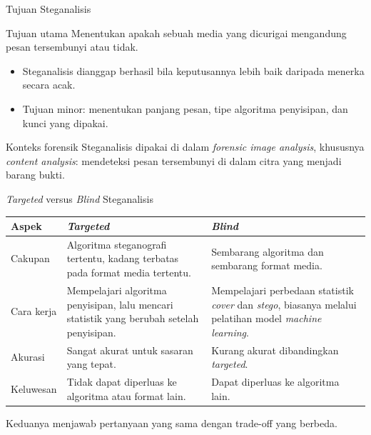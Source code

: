 \documentclass[aspectratio=169,11pt]{beamer}
\begin{document}
\begin{frame}{Tujuan Steganalisis}
    \begin{block}{Tujuan utama}
        Menentukan apakah sebuah media yang dicurigai mengandung pesan
        tersembunyi atau tidak.
    \end{block}
    \vspace{0.15cm}
    \begin{itemize}
        \item Steganalisis dianggap berhasil bila keputusannya lebih baik
              daripada menerka secara acak.
        \item Tujuan minor: menentukan panjang pesan, tipe algoritma
              penyisipan, dan kunci yang dipakai.
    \end{itemize}
    \vspace{0.15cm}
    \begin{exampleblock}{Konteks forensik}
        \footnotesize
        Steganalisis dipakai di dalam \textit{forensic image analysis},
        khususnya \textit{content analysis}: mendeteksi pesan tersembunyi di
        dalam citra yang menjadi barang bukti.
    \end{exampleblock}
\end{frame}

\begin{frame}{\textit{Targeted} versus \textit{Blind} Steganalisis}
    \footnotesize
    \renewcommand{\arraystretch}{1.2}
    \begin{tabularx}{\linewidth}{@{}>{\raggedright\arraybackslash}p{2.6cm}
        >{\raggedright\arraybackslash}X
        >{\raggedright\arraybackslash}X@{}}
        \toprule
        Aspek & \textit{Targeted} & \textit{Blind} \\
        \midrule
        Cakupan & Algoritma steganografi tertentu, kadang terbatas pada format
                 media tertentu. & Sembarang algoritma dan sembarang format
                 media. \\
        \addlinespace
        Cara kerja & Mempelajari algoritma penyisipan, lalu mencari statistik
                    yang berubah setelah penyisipan. & Mempelajari perbedaan
                    statistik \textit{cover} dan \textit{stego}, biasanya
                    melalui pelatihan model \textit{machine learning}. \\
        \addlinespace
        Akurasi & Sangat akurat untuk sasaran yang tepat. & Kurang akurat
                  dibandingkan \textit{targeted}. \\
        \addlinespace
        Keluwesan & Tidak dapat diperluas ke algoritma atau format lain. &
                    Dapat diperluas ke algoritma lain. \\
        \bottomrule
    \end{tabularx}\par
    \vspace{0.3cm}
    \raggedright
    Keduanya menjawab pertanyaan yang sama dengan trade-off yang berbeda.
\end{frame}
\end{document}
